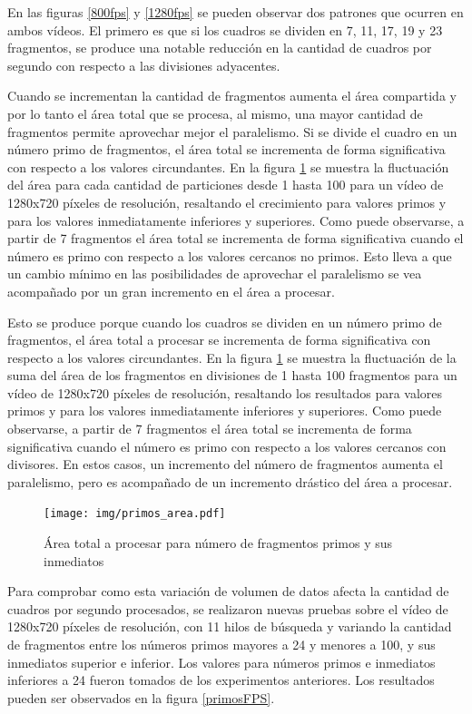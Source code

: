 En las figuras \ref{800fps} y \ref{1280fps} se pueden observar dos patrones que
ocurren en ambos vídeos. El primero es que si los cuadros se dividen en 7, 11,
17, 19 y 23 fragmentos, se produce una notable reducción en la cantidad de
cuadros por segundo con respecto a las divisiones adyacentes.

Cuando se incrementan la cantidad de fragmentos aumenta el área compartida y por
lo tanto el área total que se procesa, al mismo, una mayor cantidad de
fragmentos permite aprovechar mejor el paralelismo. Si se divide el cuadro en un
número primo de fragmentos, el área total se incrementa de forma significativa
con respecto a los valores circundantes. En la figura \ref{primosArea} se
muestra la fluctuación del área para cada cantidad de particiones desde 1 hasta
100 para un vídeo de 1280x720 píxeles de resolución, resaltando el crecimiento
para valores primos y para los valores inmediatamente inferiores y superiores.
Como puede observarse, a partir de 7 fragmentos el área total se incrementa de
forma significativa cuando el número es primo con respecto a los valores
cercanos no primos. Esto lleva a que un cambio mínimo en las posibilidades de
aprovechar el paralelismo se vea acompañado por un gran incremento en el área a
procesar.

Esto se produce porque cuando los cuadros se dividen en un número primo de
fragmentos, el área total a procesar se incrementa de forma significativa con
respecto a los valores circundantes. En la figura \ref{primosArea} se muestra la
fluctuación de la suma del área de los fragmentos en divisiones de 1 hasta 100
fragmentos para un vídeo de 1280x720 píxeles de resolución, resaltando los
resultados para valores primos y para los valores inmediatamente inferiores y
superiores. Como puede observarse, a partir de 7 fragmentos el área total se
incrementa de forma significativa cuando el número es primo con respecto a los
valores cercanos con divisores. En estos casos, un incremento del número
de fragmentos aumenta el paralelismo, pero es acompañado de un incremento
drástico del área a procesar.

\begin{figure}[!h]

	\texttt{[image: img/primos\_area.pdf]}
	\caption{Área total a procesar para número de fragmentos primos y sus inmediatos}
	\label{primosArea}

\end{figure}

Para comprobar como esta variación de volumen de datos afecta la cantidad de
cuadros por segundo procesados, se realizaron nuevas pruebas sobre el vídeo de
1280x720 píxeles de resolución, con 11 hilos de búsqueda y variando la cantidad
de fragmentos entre los números primos mayores a 24 y menores a 100, y sus
inmediatos superior e inferior. Los valores para números primos e inmediatos
inferiores a 24 fueron tomados de los experimentos anteriores. Los resultados
pueden ser observados en la figura \ref{primosFPS}.

